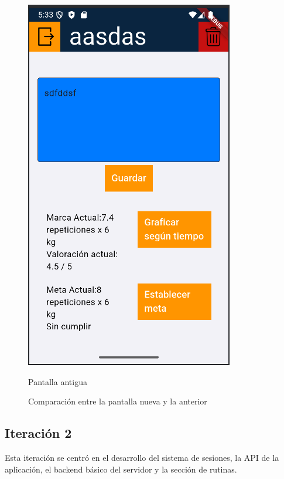 \begin{figure}[h!]
\begin{minipage}[b]{0.45\textwidth}
    \includegraphics[width=\textwidth]{fotos/ejerciciosVieja.png}
    \caption{Pantalla antigua}
    \label{fig:pantalla_vieja}
  \end{minipage}
  \caption{Comparaci\'on entre la pantalla nueva y la anterior}
  \label{fig:comparacion_pantallas}
\end{figure}

\subsection*{Iteraci\'on 2}
Esta iteraci\'on se centr\'o en el desarrollo del sistema de sesiones, la API de la aplicaci\'on, el backend b\'asico del servidor y la secci\'on de rutinas.

